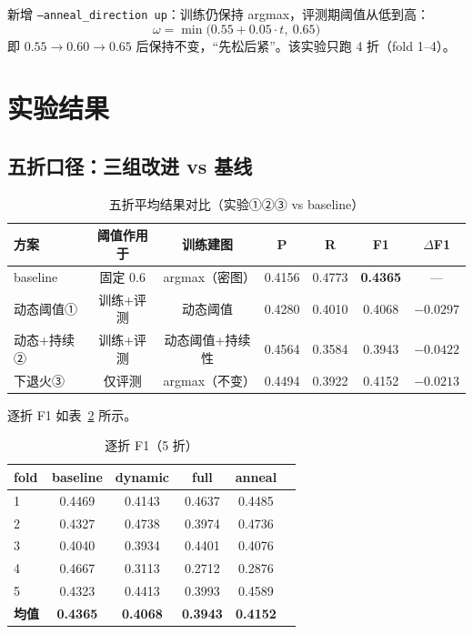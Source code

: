 \documentclass[11pt,a4paper]{ctexart}
\begin{document}
新增 \texttt{--anneal\_direction up}：训练仍保持 argmax，评测期阈值从低到高：
\begin{equation}
\omega = \min\!\big(0.55 + 0.05\cdot t,\ 0.65\big)
\end{equation}
即 $0.55\to0.60\to0.65$ 后保持不变，``先松后紧''。该实验只跑 4 折（fold 1--4）。

\section{实验结果}

\subsection{五折口径：三组改进 vs 基线}

\begin{table}[H]
\centering
\caption{五折平均结果对比（实验①②③ vs baseline）}
\label{tab:main5}
\begin{tabular}{lcccccc}
\toprule
方案 & 阈值作用于 & 训练建图 & P & R & F1 & $\Delta$F1 \\
\midrule
baseline & 固定 0.6 & argmax（密图） & 0.4156 & 0.4773 & \textbf{0.4365} & --- \\
动态阈值① & 训练+评测 & 动态阈值 & 0.4280 & 0.4010 & 0.4068 & $-0.0297$ \\
动态+持续② & 训练+评测 & 动态阈值+持续性 & 0.4564 & 0.3584 & 0.3943 & $-0.0422$ \\
下退火③ & 仅评测 & argmax（不变） & 0.4494 & 0.3922 & 0.4152 & $-0.0213$ \\
\bottomrule
\end{tabular}
\end{table}

逐折 F1 如表~\ref{tab:fold5} 所示。

\begin{table}[H]
\centering
\caption{逐折 F1（5 折）}
\label{tab:fold5}
\begin{tabular}{lccccc}
\toprule
fold & baseline & dynamic & full & anneal \\
\midrule
1 & 0.4469 & 0.4143 & 0.4637 & 0.4485 \\
2 & 0.4327 & 0.4738 & 0.3974 & 0.4736 \\
3 & 0.4040 & 0.3934 & 0.4401 & 0.4076 \\
4 & 0.4667 & 0.3113 & 0.2712 & 0.2876 \\
5 & 0.4323 & 0.4413 & 0.3993 & 0.4589 \\
\midrule
\textbf{均值} & \textbf{0.4365} & \textbf{0.4068} & \textbf{0.3943} & \textbf{0.4152} \\
\bottomrule
\end{tabular}
\end{table}
\end{document}
